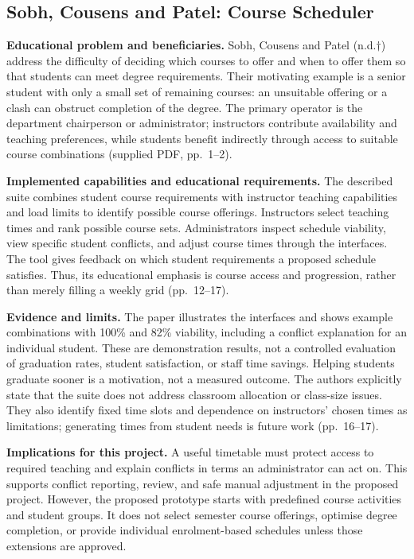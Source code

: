 \documentclass[
  11pt,a4paper,oneside]{report}
\begin{document}
\subsection{Sobh, Cousens and Patel: Course Scheduler}
\textbf{Educational problem and beneficiaries.} Sobh, Cousens and Patel (n.d.$\dagger$) address the difficulty of deciding which courses to offer and when to offer them so that students can meet degree requirements. Their motivating example is a senior student with only a small set of remaining courses: an unsuitable offering or a clash can obstruct completion of the degree. The primary operator is the department chairperson or administrator; instructors contribute availability and teaching preferences, while students benefit indirectly through access to suitable course combinations (supplied PDF, pp.~1--2).

\textbf{Implemented capabilities and educational requirements.} The described suite combines student course requirements with instructor teaching capabilities and load limits to identify possible course offerings. Instructors select teaching times and rank possible course sets. Administrators inspect schedule viability, view specific student conflicts, and adjust course times through the interfaces. The tool gives feedback on which student requirements a proposed schedule satisfies. Thus, its educational emphasis is course access and progression, rather than merely filling a weekly grid (pp.~12--17).

\textbf{Evidence and limits.} The paper illustrates the interfaces and shows example combinations with 100\% and 82\% viability, including a conflict explanation for an individual student. These are demonstration results, not a controlled evaluation of graduation rates, student satisfaction, or staff time savings. Helping students graduate sooner is a motivation, not a measured outcome. The authors explicitly state that the suite does not address classroom allocation or class-size issues. They also identify fixed time slots and dependence on instructors' chosen times as limitations; generating times from student needs is future work (pp.~16--17).

\textbf{Implications for this project.} A useful timetable must protect access to required teaching and explain conflicts in terms an administrator can act on. This supports conflict reporting, review, and safe manual adjustment in the proposed project. However, the proposed prototype starts with predefined course activities and student groups. It does not select semester course offerings, optimise degree completion, or provide individual enrolment-based schedules unless those extensions are approved.
\end{document}

